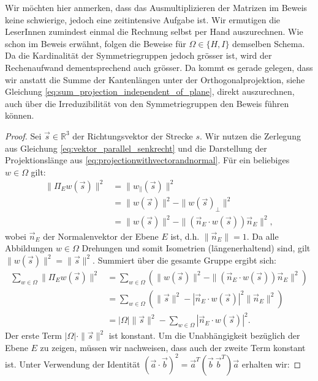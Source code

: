 Wir möchten hier anmerken, dass das Ausmultiplizieren der Matrizen im Beweis keine schwierige, jedoch eine zeitintensive Aufgabe ist. Wir ermutigen die LeserInnen zumindest einmal die Rechnung selbst per Hand auszurechnen. Wie schon im Beweis erwähnt, folgen die Beweise für $\Omega \in \{H,I\}$ demselben Schema. Da die Kardinalität der Symmetriegruppen jedoch grösser ist, wird der Rechenaufwand dementsprechend auch grösser. Da kommt es gerade gelegen, dass wir anstatt die Summe der Kantenlängen unter der Orthogonalprojektion, siehe Gleichung \eqref{eq:sum_projection_independent_of_plane}, direkt auszurechnen, auch über die Irreduzibilität von den Symmetriegruppen den Beweis führen können.
\begin{proof}
    Sei $\vec{s} \in \mathbb{R}^3$ der Richtungsvektor der Strecke $s$. Wir nutzen die Zerlegung aus Gleichung \eqref{eq:vektor_parallel_senkrecht} und die Darstellung der Projektionslänge aus \eqref{eq:projectionwithvectorandnormal}. Für ein beliebiges $w \in \Omega$ gilt:
    \begin{align} 
        \|\Pi_{E}w(\vec{s})\|^2 &= \|w_{\parallel}(\vec{s})\|^2 \nonumber \\
        &= \|w(\vec{s})\|^2 - \|w(\vec{s})_{\perp}\|^2 \nonumber \\
        &= \|w(\vec{s})\|^2 - \|\left(\vec{n}_E \cdot w(\vec{s})\right)\vec{n}_E\|^2, \nonumber
    \end{align}
    wobei $\vec{n}_E$ der Normalenvektor der Ebene $E$ ist, d.h. $\|\vec{n}_E\| = 1$. Da alle Abbildungen $w \in \Omega$ Drehungen und somit Isometrien (längenerhaltend) sind, gilt $\|w(\vec{s})\|^2 = \|\vec{s}\|^2$. Summiert über die gesamte Gruppe ergibt sich:
    \begin{align} 
        \sum_{w \in \Omega} \|\Pi_{E}w(\vec{s})\|^2 &= \sum_{w \in \Omega} \left( \|w(\vec{s})\|^2 - \|\left(\vec{n}_E \cdot w(\vec{s})\right)\vec{n}_E\|^2 \right) \nonumber \\
        &= \sum_{w \in \Omega} \left( \|\vec{s}\|^2 - |\vec{n}_E \cdot w(\vec{s})|^2 \|\vec{n}_E \|^2\right) \nonumber \\
        &= |\Omega|  \|\vec{s}\|^2 - \sum_{w \in \Omega} |\vec{n}_E \cdot w(\vec{s})|^2. \nonumber
    \end{align}
    Der erste Term $|\Omega| \cdot \|\vec{s}\|^2$ ist konstant. Um die Unabhängigkeit bezüglich der Ebene $E$ zu zeigen, müssen wir nachweisen, dass auch der zweite Term konstant ist. Unter Verwendung der Identität $(\vec{a} \cdot \vec{b})^2 = \vec{a}^T(\vec{b} \ \vec{b}^T)\vec{a}$ erhalten wir:

\end{proof}
